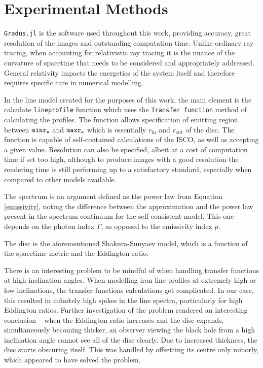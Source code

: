 \documentclass[fleqn,usenatbib,useAMS]{mnras}
\begin{document}
\section{Experimental Methods} %

{\tt Gradus.jl} \cite{baker2022} is the software used throughout this work, providing accuracy, great resolution of the images and outstanding computation time. Unlike ordinary ray tracing, when accounting for relativistic ray tracing it is the nuance of the curvature of spacetime that needs to be considered and appropriately addressed. General relativity impacts the energetics of the system itself and therefore requires specific care in numerical modelling.

In the line model created for the purposes of this work, the main element is the calculate {\tt lineprofile} function which uses the {\tt Transfer function} method of calculating the profiles. The function allows specification of emitting region between ${\tt minr_{e}}$ and ${\tt maxr_{e}}$ which is essentially $r_{\text{in}}$ and $r_{\text{out}}$ of the disc. The function is capable of self-contained calculations of the ISCO, as well as accepting a given value. Resolution can also be specified, albeit at a cost of computation time if set too high, although to produce images with a good resolution the rendering time is still performing up to a satisfactory standard, especially when compared to other models available.


The spectrum is an argument defined as the power law from Equation \ref{emissivity}, noting the difference between the approximation and the power law present in the spectrum continuum for the self-consistent model. This one depends on the photon index $\Gamma$, as opposed to the emissivity index $p$. 

The disc is the aforementioned Shakura-Sunyaev \cite{shakura1973black} model, which is a function of the spacetime metric and the Eddington ratio.

There is an interesting problem to be mindful of when handling transfer functions at high inclination angles. When modelling iron line profiles at extremely high or low inclinations, the transfer functions calculations get complicated. In our case, this resulted in infinitely high spikes in the line spectra, particularly for high Eddington ratios. Further investigation of the problem rendered an interesting conclusion -- when the Eddington ratio increases and the disc expands, simultaneously becoming thicker, an observer viewing the black hole from a high inclination angle cannot see all of the disc clearly. Due to increased thickness, the disc starts obscuring itself. This was handled by offsetting its centre only minorly, which appeared to have solved the problem.
\end{document}
